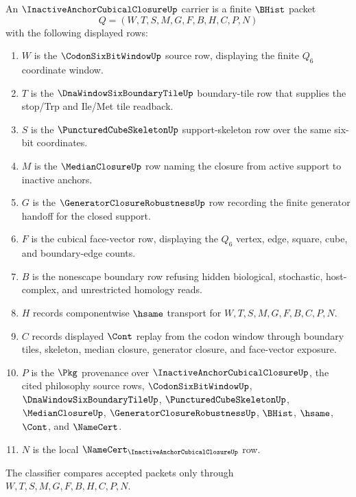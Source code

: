 \begin{definition}
\label{def:inactive-anchor-cubical-closure-carrier}
An $\InactiveAnchorCubicalClosureUp$ carrier is a finite $\BHist$ packet
$$
Q=(W,T,S,M,G,F,B,H,C,P,N)
$$
with the following displayed rows:
\begin{enumerate}
\item $W$ is the $\CodonSixBitWindowUp$ source row, displaying the finite $Q_{6}$ coordinate window.
\item $T$ is the $\DnaWindowSixBoundaryTileUp$ boundary-tile row that supplies the stop/Trp and Ile/Met tile readback.
\item $S$ is the $\PuncturedCubeSkeletonUp$ support-skeleton row over the same six-bit coordinates.
\item $M$ is the $\MedianClosureUp$ row naming the closure from active support to inactive anchors.
\item $G$ is the $\GeneratorClosureRobustnessUp$ row recording the finite generator handoff for the closed support.
\item $F$ is the cubical face-vector row, displaying the $Q_{6}$ vertex, edge, square, cube, and boundary-edge counts.
\item $B$ is the nonescape boundary row refusing hidden biological, stochastic, host-complex, and unrestricted homology reads.
\item $H$ records componentwise $\hsame$ transport for $W,T,S,M,G,F,B,C,P,N$.
\item $C$ records displayed $\Cont$ replay from the codon window through boundary tiles, skeleton, median closure, generator closure, and face-vector exposure.
\item $P$ is the $\Pkg$ provenance over $\InactiveAnchorCubicalClosureUp$, the cited philosophy source rows, $\CodonSixBitWindowUp$, $\DnaWindowSixBoundaryTileUp$, $\PuncturedCubeSkeletonUp$, $\MedianClosureUp$, $\GeneratorClosureRobustnessUp$, $\BHist$, $\hsame$, $\Cont$, and $\NameCert$.
\item $N$ is the local $\NameCert_{\InactiveAnchorCubicalClosureUp}$ row.
\end{enumerate}
The classifier compares accepted packets only through $W,T,S,M,G,F,B,H,C,P,N$.
\end{definition}


